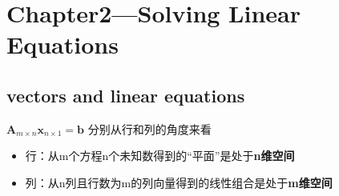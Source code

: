    \section{Chapter2---Solving Linear Equations}
    \subsection{vectors and linear equations}
    $\bm{A}_{m\times n}\bm{x}_{n \times 1}=\bm{b}$ 分别从行和列的角度来看
    \begin{itemize}
        \item 行：从m个方程n个未知数得到的“平面”是处于\textbf{n维空间}
        \item 列：从n列且行数为m的列向量得到的线性组合是处于\textbf{m维空间}
    \end{itemize}

